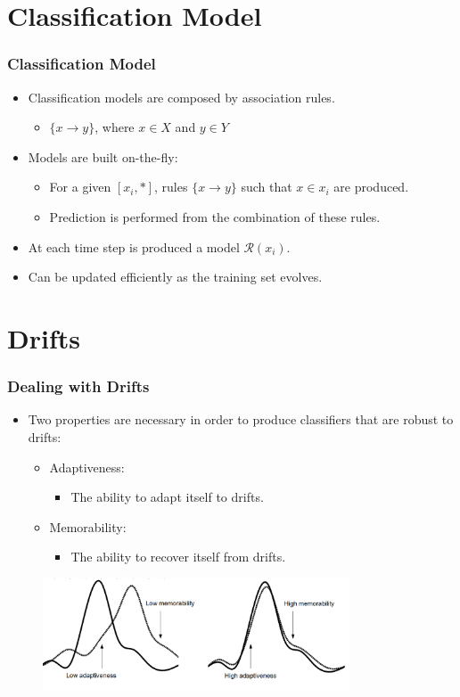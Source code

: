 \documentclass[14pt]{beamer}
\begin{document}
\section{Classification Model}
\begin{frame}\frametitle{Classification Model}
\begin{itemize}
\item Classification models are composed by association rules.
  \begin{itemize}
    \item $\{x \to y\}$, where $x \in X$ and $y \in Y$
  \end{itemize}
\item Models are built on-the-fly:
  \begin{itemize}
    \item For a given $[x_i, *]$, rules $\{x \to y\}$ such that $x \in x_i$ are produced.
    \item Prediction is performed from the combination of these rules.
  \end{itemize}
\item At each time step is produced a model $\mathcal{R}(x_i)$.
\pause
\item \alert{Can be updated efficiently as the training set evolves.}
\end{itemize}
\end{frame}

\section{Drifts}
\begin{frame}\frametitle{Dealing with Drifts}

\begin{itemize}
\item Two properties are necessary in order to produce classifiers that are robust to drifts:
\begin{itemize}
\item Adaptiveness:
\begin{itemize}
\item The ability to adapt itself to drifts.
\end{itemize}
\item Memorability:
\begin{itemize}
\item The ability to recover itself from drifts.
\end{itemize}
\end{itemize}
\end{itemize}

\begin{figure}
\centering
\includegraphics[height=1.30in]{drift3}
\end{figure}
\end{frame}
\end{document}
